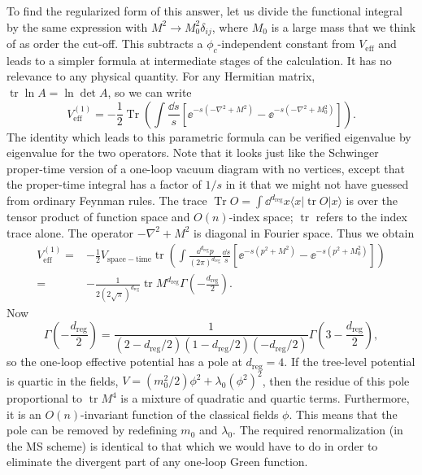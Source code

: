 To find the regularized form of this answer, let us divide the functional
integral by the same expression with $M^2\to M_0^2\delta_{ij}$, where $M_0$
is a large mass that we think of as order the cut-off. This subtracts a
$\phi_c$-independent constant from $V_{\mathrm{eff}}$ and leads to a simpler
formula at intermediate stages of the calculation. It has no relevance to any
physical quantity. For any Hermitian matrix, $\operatorname{tr}\ln A=\ln\det A$,
so we can write
\[
  V_{\mathrm{eff}}^{(1)}=-\frac12\operatorname{Tr}\left(\int\frac{\dd s}{s}
  \left[\ee^{-s(-\nabla^2+M^2)}-\ee^{-s(-\nabla^2+M_0^2)}\right]\right).
\]
The identity which leads to this parametric formula can be verified eigenvalue
by eigenvalue for the two operators. Note that it looks just like the
Schwinger proper-time version of a one-loop vacuum diagram with no vertices,
except that the proper-time integral has a factor of $1/s$ in it that we might
not have guessed from ordinary Feynman rules. The trace
$\operatorname{Tr}O=\int\dd^{d_{\mathrm{reg}}}x\langle x|\operatorname{tr}O|x\rangle$ is over the
tensor product of function space and $O(n)$-index space; $\operatorname{tr}$
refers to the index trace alone. The operator $-\nabla^2+M^2$ is diagonal in
Fourier space. Thus we obtain
\[
\begin{aligned}
  V_{\mathrm{eff}}^{(1)}={}&-\frac12V_{\mathrm{space-time}}\operatorname{tr}
  \left(\int\frac{\dd^{d_{\mathrm{reg}}}p}{(2\pi)^{d_{\mathrm{reg}}}}\frac{\dd s}{s}
  \left[\ee^{-s(p^2+M^2)}-\ee^{-s(p^2+M_0^2)}\right]\right)\\
  ={}&-\frac{1}{2(2\sqrt\pi)^{d_{\mathrm{reg}}}}
  \operatorname{tr}M^{d_{\mathrm{reg}}}
  \Gamma\!\left(-\frac {d_{\mathrm{reg}}}{2}\right).
\end{aligned}
\]
Now
\[
  \Gamma\!\left(-\frac {d_{\mathrm{reg}}}{2}\right)=
  \frac{1}{(2-d_{\mathrm{reg}}/2)(1-d_{\mathrm{reg}}/2)(-d_{\mathrm{reg}}/2)}
  \Gamma\!\left(3-\frac {d_{\mathrm{reg}}}{2}\right),
\]
so the one-loop effective potential has a pole at $d_{\mathrm{reg}}=4$. If the tree-level
potential is quartic in the fields,
$V=(m_0^2/2)\phi^2+\lambda_0(\phi^2)^2$, then the residue of this pole
proportional to $\operatorname{tr}M^4$ is a mixture of quadratic and quartic
terms. Furthermore, it is an $O(n)$-invariant function of the classical fields
$\phi$. This means that the pole can be removed by redefining $m_0$ and
$\lambda_0$. The required renormalization (in the MS scheme) is identical to
that which we would have to do in order to eliminate the divergent part of any
one-loop Green function.

